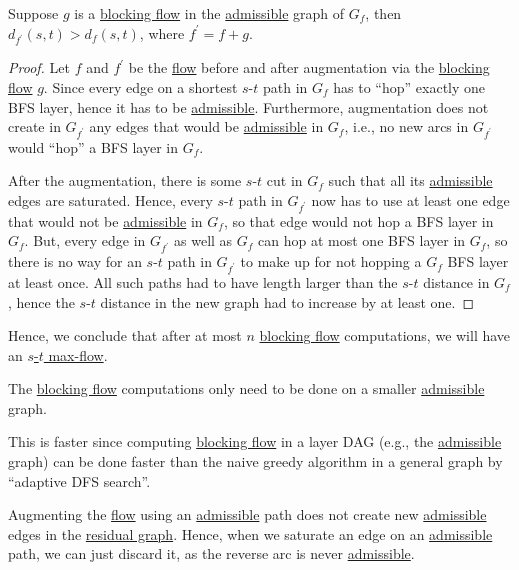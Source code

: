 \begin{lemma}\label{lma:blocking-flow-progress}
	Suppose \(g\) is a \hyperref[def:blocking-flow]{blocking flow} in the \hyperref[def:admissible]{admissible} graph of \(G_f\), then \(d_{f^{\prime} }(s, t) > d_f(s, t)\), where \(f^{\prime} = f + g\).
\end{lemma}
\begin{proof}
	Let \(f\) and \(f^{\prime} \) be the \hyperref[def:flow]{flow} before and after augmentation via the \hyperref[def:blocking-flow]{blocking flow} \(g\). Since every edge on a shortest \(s\)-\(t\) path in \(G_f\) has to ``hop'' exactly one BFS layer, hence it has to be \hyperref[def:admissible]{admissible}. Furthermore, augmentation does not create in \(G_{f^{\prime} }\) any edges that would be \hyperref[def:admissible]{admissible} in \(G_f\), i.e., no new arcs in \(G_{f^{\prime} }\) would ``hop'' a BFS layer in \(G_f\).

	After the augmentation, there is some \(s\)-\(t\) cut in \(G_f\) such that all its \hyperref[def:admissible]{admissible} edges are saturated. Hence, every \(s\)-\(t\) path in \(G_{f^{\prime} }\) now has to use at least one edge that would not be \hyperref[def:admissible]{admissible} in \(G_f\), so that edge would not hop a BFS layer in \(G_f\). But, every edge in \(G_{f^{\prime} }\) as well as \(G_f\) can hop at most one BFS layer in \(G_f\), so there is no way for an \(s\)-\(t\) path in \(G_{f^{\prime} }\) to make up for not hopping a \(G_f\) BFS layer at least once. All such paths had to have length larger than the \(s\)-\(t\) distance in \(G_f\), hence the \(s\)-\(t\) distance in the new graph had to increase by at least one.
\end{proof}

Hence, we conclude that after at most \(n\) \hyperref[def:blocking-flow]{blocking flow} computations, we will have an \hyperref[prb:s-t-max-flow]{\(s\)-\(t\) max-flow}.

\begin{note}
	The \hyperref[def:blocking-flow]{blocking flow} computations only need to be done on a smaller \hyperref[def:admissible]{admissible} graph.
\end{note}

This is faster since computing \hyperref[def:blocking-flow]{blocking flow} in a layer DAG (e.g., the \hyperref[def:admissible]{admissible} graph) can be done faster than the naive greedy algorithm in a general graph by ``adaptive DFS search''.

\begin{intuition}
	Augmenting the \hyperref[def:flow]{flow} using an \hyperref[def:admissible]{admissible} path does not create new \hyperref[def:admissible]{admissible} edges in the \hyperref[def:residual-graph]{residual graph}. Hence, when we saturate an edge on an \hyperref[def:admissible]{admissible} path, we can just discard it, as the reverse arc is never \hyperref[def:admissible]{admissible}.
\end{intuition}

